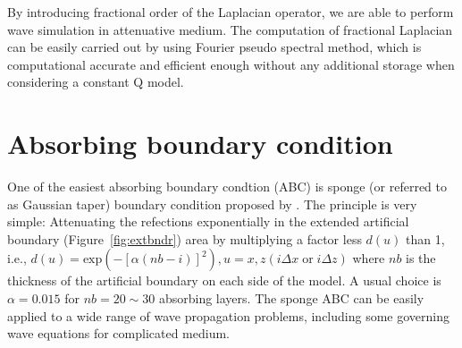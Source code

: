 By introducing fractional order of the Laplacian operator, we are able to perform wave simulation in attenuative medium. The computation of fractional Laplacian can be easily carried out by using Fourier pseudo spectral method, which is computational accurate and efficient enough without any additional storage when considering a constant Q model.

\appendix



\section*{Absorbing boundary condition}
One of the easiest absorbing boundary condtion (ABC) is sponge (or referred to as Gaussian taper) boundary condition proposed by \cite{Cerjan_1985_NBC}. The principle is very simple: Attenuating the refections exponentially in the extended artificial boundary (Figure~\ref{fig:extbndr}) area by multiplying a factor less $d(u)$ than 1, i.e., $ d(u)=\mathrm{exp}(-[\alpha(nb-i)]^2), u=x,z (i\Delta x \; \mathrm{or} \; i\Delta z)$
where $nb$ is the thickness of the artificial boundary on each side of the model. A  usual choice is $\alpha=0.015$ for $nb=20\sim30$ absorbing layers. The sponge ABC can be easily applied to a wide range of wave propagation problems, including some  governing wave equations for complicated medium. 






